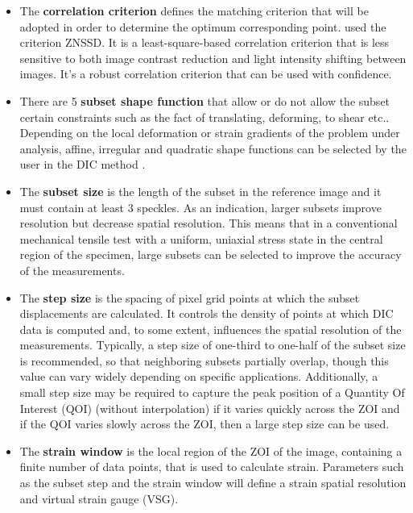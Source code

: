 \begin{itemize}
	\item The \textbf{correlation criterion} defines the matching criterion that will be adopted in order to determine the optimum corresponding point. \cite{MALFAIT2021}  used the criterion ZNSSD. It is a least-square-based correlation criterion that is less sensitive to both image contrast reduction and light intensity shifting between images. It's a robust correlation criterion that can be used with confidence. 
	\item There are 5 \textbf{subset shape function} that allow or do not allow the subset certain constraints such as the fact of translating, deforming, to shear etc.. Depending on the local deformation or strain gradients of the problem under analysis, affine, irregular and quadratic shape functions can be selected by the user in the DIC method \cite{PereiraandXavier2018}. 
	\item The \textbf{subset size} is the length of the subset in the reference image and it must contain at least 3 speckles. As an indication, larger subsets improve resolution but decrease spatial resolution. This means that in a conventional mechanical tensile test with a uniform, uniaxial stress state in the central region of the specimen, large subsets can be selected to improve the accuracy of the measurements.
	\item The \textbf{step size} is the spacing of pixel grid points at which the subset displacements are calculated. It controls the density of points at which DIC data is computed and, to some extent, influences the spatial resolution of the measurements. Typically, a step size of one-third to one-half of the subset size is recommended, so that neighboring subsets partially overlap, though this value can vary widely depending on specific applications. Additionally, a small step size may be required to capture the peak position of a Quantity Of Interest (QOI) (without interpolation) if it varies quickly across the ZOI and if the QOI varies slowly across the ZOI, then a large step size can be used. 
	\item The \textbf{strain window} is the local region of the ZOI of the image, containing a finite number of data points, that is used to calculate strain. Parameters such as the subset step and the strain window will define a strain spatial resolution and virtual strain gauge (VSG). 

\end{itemize}
